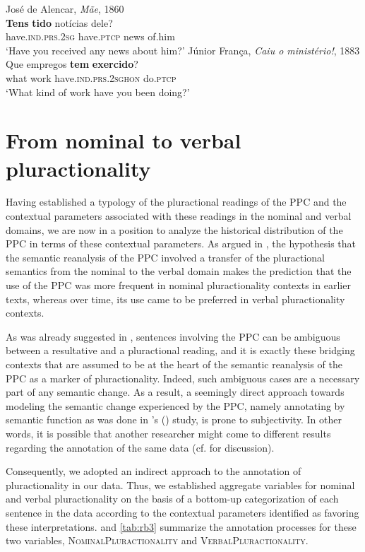 \documentclass[output=paper,colorlinks,citecolor=brown]{langscibook}
\begin{document}
\ea\label{ex:rb20}
José de Alencar, \textit{Mãe}, 1860\\
\gll \textbf{Tens} \textbf{tido} notícias dele?\\
have.\textsc{ind.prs.2sg} have.\textsc{ptcp} news of.him\\
\glt ‘Have you received any news about him?’
\ex\label{ex:rb21}
Júnior França, \textit{Caiu o ministério!}, 1883\\
\gll Que empregos \textbf{tem} \textbf{exercido}?\\
what work have.\textsc{ind.prs.2sghon} do.\textsc{ptcp}\\
\glt ‘What kind of work have you been doing?’
\z

\section{From nominal to verbal pluractionality}\label{sec:rb5}

Having established a typology of the pluractional readings of the PPC and the contextual parameters associated with these readings in the nominal and verbal domains, we are now in a position to analyze the historical distribution of the PPC in terms of these contextual parameters. As argued in , the hypothesis that the semantic reanalysis of the PPC involved a transfer of the pluractional semantics from the nominal to the verbal domain makes the prediction that the use of the PPC was more frequent in nominal pluractionality contexts in earlier texts, whereas over time, its use came to be preferred in verbal pluractionality contexts.

As was already suggested in , sentences involving the PPC can be ambiguous between a resultative and a pluractional reading, and it is exactly these bridging contexts that are assumed to be at the heart of the semantic reanalysis of the PPC as a marker of pluractionality. Indeed, such ambiguous cases are a necessary part of any semantic change. As a result, a seemingly direct approach towards modeling the semantic change experienced by the PPC, namely annotating by semantic function as was done in \citeauthor{Barbosa2014}’s (\citeyear{Barbosa2014}) study, is prone to subjectivity. In other words, it is possible that another researcher might come to different results regarding the annotation of the same data (cf. \citeauthor{Rosemeyer2016a} \citeyear{Rosemeyer2016a} for discussion).

Consequently, we adopted an indirect approach to the annotation of pluractionality in our data. Thus, we established aggregate variables for nominal and verbal pluractionality on the basis of a bottom-up categorization of each sentence in the data according to the contextual parameters identified as favoring these interpretations.  and \ref{tab:rb3} summarize the annotation processes for these two variables, \textsc{NominalPluractionality} and \textsc{VerbalPluractionality}.
\end{document}
